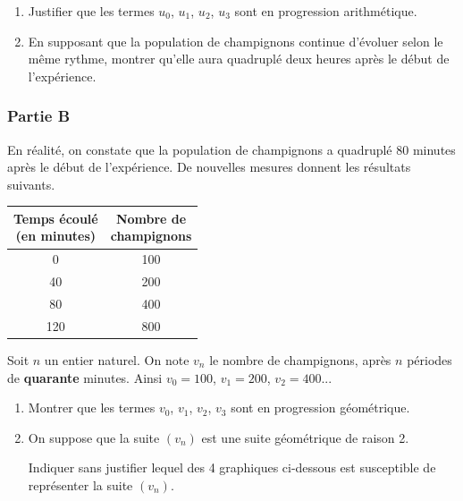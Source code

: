 \begin{enumerate}
\item Justifier que les termes $u_0$, $u_1$, $u_2$, $u_3$ sont en progression arithmétique.

\item En supposant que la population de champignons continue d'évoluer selon le même rythme, montrer qu'elle aura quadruplé deux heures après le début de l'expérience.
\end{enumerate}

\begin{minipage}[t]{0.6\textwidth}
\subsubsection*{Partie B}
En réalité, on constate que la population de champignons a quadruplé 80 minutes après le début de l'expérience. De nouvelles mesures donnent les résultats suivants.
\end{minipage}
\hfill
\begin{minipage}[t]{0.35\textwidth}
\vspace{0pt}
\begin{center}
\begin{tabular}{|c|c|}
\hline
\makecell{Temps écoulé \\ (en minutes)} & \makecell{Nombre de \\ champignons} \\
\hline
0 & 100 \\
40 & 200 \\
80 & 400 \\
120 & 800 \\
\hline
\end{tabular}
\end{center}
\end{minipage}

Soit $n$ un entier naturel. On note $v_n$ le nombre de champignons, après $n$ périodes de \textbf{quarante} minutes. Ainsi $v_0 = 100$, $v_1 = 200$, $v_2 = 400$...

\begin{enumerate}
\item Montrer que les termes $v_0$, $v_1$, $v_2$, $v_3$ sont en progression géométrique.

\item On suppose que la suite $(v_n)$ est une suite géométrique de raison 2.

Indiquer sans justifier lequel des 4 graphiques ci-dessous est susceptible de représenter la suite $(v_n)$.
\end{enumerate}

